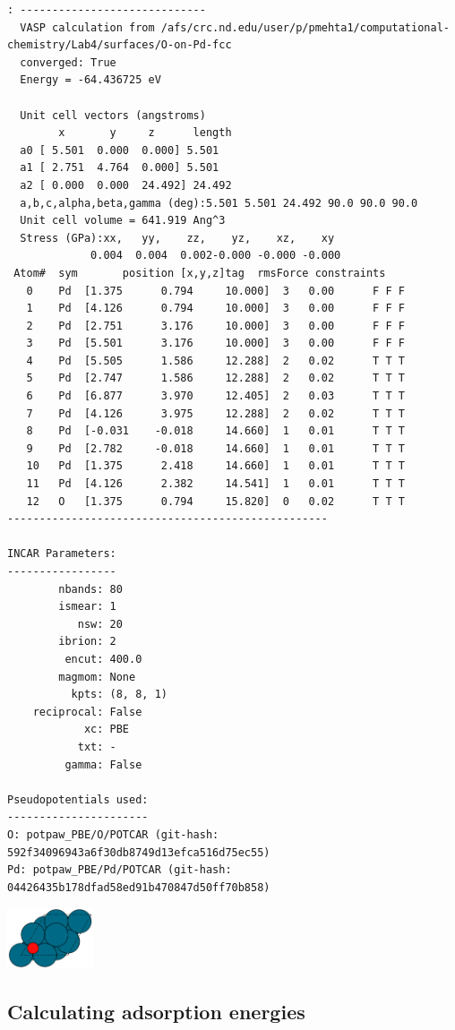 \documentclass[11pt]{article}
\begin{document}
\begin{verbatim}
: -----------------------------
  VASP calculation from /afs/crc.nd.edu/user/p/pmehta1/computational-chemistry/Lab4/surfaces/O-on-Pd-fcc
  converged: True
  Energy = -64.436725 eV

  Unit cell vectors (angstroms)
        x       y     z      length
  a0 [ 5.501  0.000  0.000] 5.501
  a1 [ 2.751  4.764  0.000] 5.501
  a2 [ 0.000  0.000  24.492] 24.492
  a,b,c,alpha,beta,gamma (deg):5.501 5.501 24.492 90.0 90.0 90.0
  Unit cell volume = 641.919 Ang^3
  Stress (GPa):xx,   yy,    zz,    yz,    xz,    xy
             0.004  0.004  0.002-0.000 -0.000 -0.000
 Atom#  sym       position [x,y,z]tag  rmsForce constraints
   0    Pd  [1.375      0.794     10.000]  3   0.00      F F F
   1    Pd  [4.126      0.794     10.000]  3   0.00      F F F
   2    Pd  [2.751      3.176     10.000]  3   0.00      F F F
   3    Pd  [5.501      3.176     10.000]  3   0.00      F F F
   4    Pd  [5.505      1.586     12.288]  2   0.02      T T T
   5    Pd  [2.747      1.586     12.288]  2   0.02      T T T
   6    Pd  [6.877      3.970     12.405]  2   0.03      T T T
   7    Pd  [4.126      3.975     12.288]  2   0.02      T T T
   8    Pd  [-0.031    -0.018     14.660]  1   0.01      T T T
   9    Pd  [2.782     -0.018     14.660]  1   0.01      T T T
   10   Pd  [1.375      2.418     14.660]  1   0.01      T T T
   11   Pd  [4.126      2.382     14.541]  1   0.01      T T T
   12   O   [1.375      0.794     15.820]  0   0.02      T T T
--------------------------------------------------

INCAR Parameters:
-----------------
        nbands: 80
        ismear: 1
           nsw: 20
        ibrion: 2
         encut: 400.0
        magmom: None
          kpts: (8, 8, 1)
    reciprocal: False
            xc: PBE
           txt: -
         gamma: False

Pseudopotentials used:
----------------------
O: potpaw_PBE/O/POTCAR (git-hash: 592f34096943a6f30db8749d13efca516d75ec55)
Pd: potpaw_PBE/Pd/POTCAR (git-hash: 04426435b178dfad58ed91b470847d50ff70b858)
\end{verbatim}

\includegraphics[width=1in]{./images/Pd-slab-O-fcc.png}



\subsection{Calculating adsorption energies}
\label{sec-3-4}
\end{document}
